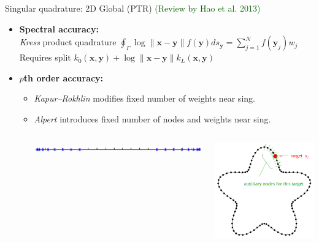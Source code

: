 \documentclass[t]{beamer}
\newcommand{\mbf}[1]{{\bm #1}}           %
\newcommand{\who}[1]{{\scriptsize \textcolor{darkgreen}{(#1)}}}  %
\newcommand{\vg}{\vspace{2ex}}
\newcommand{\xx}{\mbf{x}}
\newcommand{\yy}{\mbf{y}}
\begin{document}
\begin{frame}{Singular quadrature: 2D Global (PTR)}
  \hfill
  \who{Review by Hao et al. 2013}
\begin{itemize}
\item \textbf{Spectral accuracy:} \\
  \emph{Kress} product quadrature
  $\oint_\Gamma \log\|\xx-\yy\| f(\yy) ds_\yy = \sum_{j=1}^N f(\yy_j) w_j$ \\
  Requires split $k_0(\xx, \yy) + \log\|\xx-\yy\| k_L(\xx, \yy) $
  \vg
\item \textbf{$p$th order accuracy:}
  \begin{itemize}
  \item \emph{Kapur–Rokhlin} modifies fixed number of weights near sing.
  \item \emph{Alpert} introduces fixed number of nodes and weights near sing.
    \begin{columns}[c]
      \begin{column}{0.6\textwidth}
        \includegraphics[width=\textwidth]{fig/alpert}
      \end{column}
      \begin{column}{0.3\textwidth}
        \includegraphics[width=\textwidth]{fig/alpert_starfish}
      \end{column}
    \end{columns}
  \end{itemize}
\end{itemize}
\end{frame}
\end{document}
